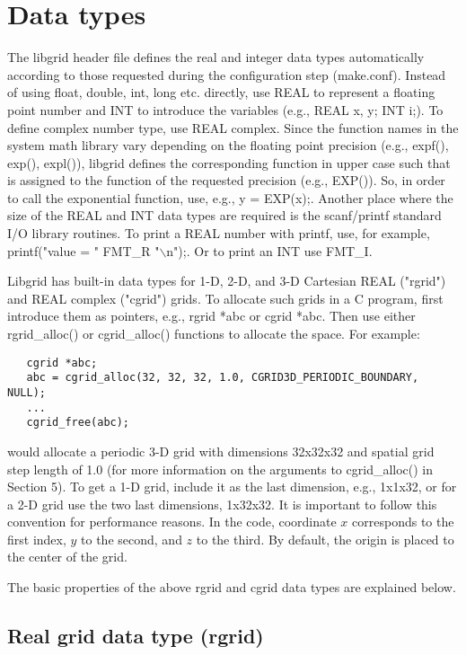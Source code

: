 \documentclass[12pt,letterpaper]{article}
\begin{document}
\section{Data types}

The libgrid header file defines the real and integer data types automatically according to those requested during the configuration step (make.conf). Instead of using float, double, int, long etc. directly, use REAL to represent a floating point number and INT to introduce the variables (e.g., REAL x, y; INT i;). To define complex number type, use REAL complex. Since the function names in the system math library vary depending on the floating point precision (e.g., expf(), exp(), expl()), libgrid defines the corresponding function in upper case such that is assigned to the function of the requested precision (e.g., EXP()). So, in order to call the exponential function, use, e.g., y = EXP(x);. Another place where the size of the REAL and INT data types are required is the scanf/printf standard I/O library routines. To print a REAL number with printf, use, for example, printf("value = " FMT\_R "$\backslash$n");. Or to print an INT use FMT\_I.

Libgrid has built-in data types for 1-D, 2-D, and 3-D Cartesian REAL ("rgrid") and REAL complex ("cgrid") grids. To allocate such grids in a C program, first introduce them as pointers, e.g., rgrid *abc or cgrid *abc. Then use either rgrid\_alloc() or cgrid\_alloc() functions to allocate the space. For example:
\begin{verbatim}
   cgrid *abc;
   abc = cgrid_alloc(32, 32, 32, 1.0, CGRID3D_PERIODIC_BOUNDARY, NULL);
   ...
   cgrid_free(abc);
\end{verbatim}
would allocate a periodic 3-D grid with dimensions 32x32x32 and spatial grid step length of 1.0 (for more information on the arguments to cgrid\_alloc() in Section 5). To get a 1-D grid, include it as the last dimension, e.g., 1x1x32, or for a 2-D grid use the two last dimensions, 1x32x32. It is important to follow this convention for performance reasons. In the code, coordinate $x$ corresponds to the first index, $y$ to the second, and $z$ to the third. By default, the origin is placed to the center of the grid.

The basic properties of the above rgrid and cgrid data types are explained below.

\subsection{Real grid data type (rgrid)}
\end{document}
